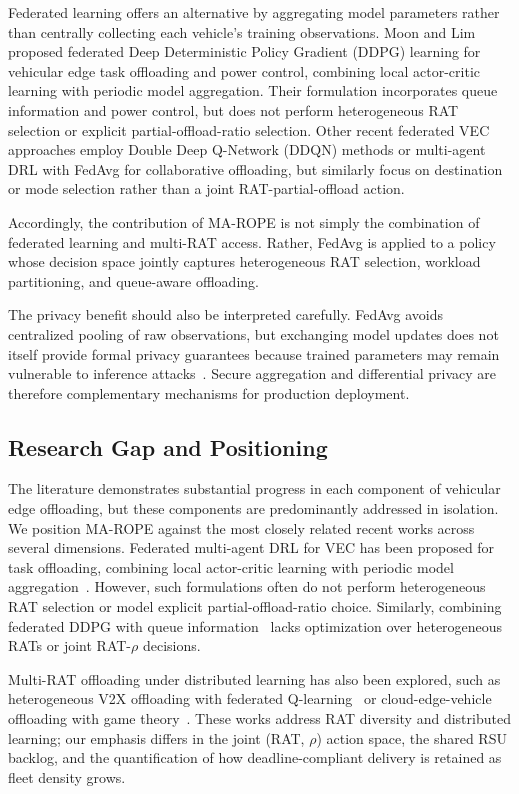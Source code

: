 \documentclass[journal,10pt,twocolumn]{IEEEtran}
\begin{document}
Federated learning offers an alternative by aggregating model parameters rather than centrally collecting each vehicle's training observations. Moon and Lim~\cite{moonlim2022} proposed federated Deep Deterministic Policy Gradient (DDPG) learning for vehicular edge task offloading and power control, combining local actor-critic learning with periodic model aggregation. Their formulation incorporates queue information and power control, but does not perform heterogeneous RAT selection or explicit partial-offload-ratio selection. Other recent federated VEC approaches employ Double Deep Q-Network (DDQN) methods or multi-agent DRL with FedAvg for collaborative offloading, but similarly focus on destination or mode selection rather than a joint RAT-partial-offload action.

Accordingly, the contribution of MA-ROPE is not simply the combination of federated learning and multi-RAT access. Rather, FedAvg is applied to a policy whose decision space jointly captures heterogeneous RAT selection, workload partitioning, and queue-aware offloading.

The privacy benefit should also be interpreted carefully. FedAvg avoids centralized pooling of raw observations, but exchanging model updates does not itself provide formal privacy guarantees because trained parameters may remain vulnerable to inference attacks~\cite{zhu2019}. Secure aggregation and differential privacy are therefore complementary mechanisms for production deployment.

\subsection{Research Gap and Positioning}

The literature demonstrates substantial progress in each component of vehicular edge offloading, but these components are predominantly addressed in isolation. We position MA-ROPE against the most closely related recent works across several dimensions. Federated multi-agent DRL for VEC has been proposed for task offloading, combining local actor-critic learning with periodic model aggregation~\cite{zhao2024}. However, such formulations often do not perform heterogeneous RAT selection or model explicit partial-offload-ratio choice. Similarly, combining federated DDPG with queue information~\cite{moonlim2022} lacks optimization over heterogeneous RATs or joint RAT-$\rho$ decisions.

Multi-RAT offloading under distributed learning has also been explored, such as heterogeneous V2X offloading with federated Q-learning~\cite{xiong2021} or cloud-edge-vehicle offloading with game theory~\cite{guo2026}. These works address RAT diversity and distributed learning; our emphasis differs in the joint (RAT, $\rho$) action space, the shared RSU backlog, and the quantification of how deadline-compliant delivery is retained as fleet density grows.
\end{document}
